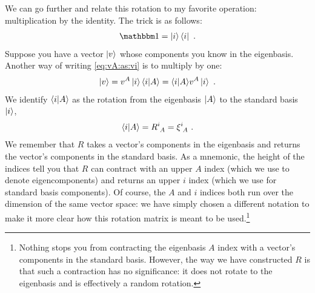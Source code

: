 \documentclass[12pt, oneside]{report}    %
\begin{document}
We can go further and relate this rotation to my favorite operation: multiplication by the identity. The trick is as follows:
\begin{align}
    \one = \ket{i}\bra{i} \ .
\end{align}
Suppose you have a vector $\left|v\right\rangle$ whose components you know in the eigenbasis. Another way of writing \eqref{eq:vA:as:vi} is to multiply by one:
\begin{align}
    \left|v\right\rangle = v^A \left|i\right\rangle\langle i | A\rangle = \langle i | A\rangle v^A \left|i\right\rangle \ .
\end{align}
We identify $\langle i | A \rangle$ as the rotation from the eigenbasis $\left|A\right\rangle$ to the standard basis $\left|i\right\rangle$, 
\begin{align}
    \la i | A \ra = R\aij{i}{A} = \xi\aij{i}{A} \ .
\end{align}
We remember that $R$ takes a vector's components in the eigenbasis and returns the vector's components in the standard basis. As a mnemonic, the height of the indices tell you that $R$ can contract with an upper $A$ index (which we use to denote eigencomponents) and returns an upper $i$ index (which we use for standard basis components). Of course, the $A$ and $i$ indices both run over the dimension of the same vector space: we have simply chosen a different notation to make it more clear how this rotation matrix is meant to be used.\footnote{Nothing stops you from contracting the eigenbasis $A$ index with a vector's components in the standard basis. However, the way we have constructed $R$ is that such a contraction has no significance: it does not rotate to the eigenbasis and is effectively a random rotation. }
\end{document}
